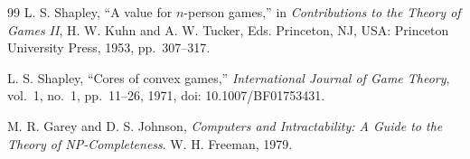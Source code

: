 \documentclass{article}
\theoremstyle{definition}
\theoremstyle{remark}
\theoremstyle{remark}
\theoremstyle{plain}
\theoremstyle{definition}
\theoremstyle{definition}
\theoremstyle{definition}
\begin{document}
\begin{thebibliography}{99}
L. S. Shapley, ``A value for $n$-person games,'' in
\textit{Contributions to the Theory of Games II}, H. W. Kuhn and
A. W. Tucker, Eds. Princeton, NJ, USA: Princeton University Press, 1953,
pp.~307--317.

L. S. Shapley, ``Cores of convex games,''
\textit{International Journal of Game Theory}, vol.~1, no.~1,
pp.~11--26, 1971, doi: 10.1007/BF01753431.

M. R. Garey and D. S. Johnson, \textit{Computers and Intractability:
A Guide to the Theory of NP-Completeness}. W. H. Freeman, 1979.
\end{thebibliography}
\end{document}
